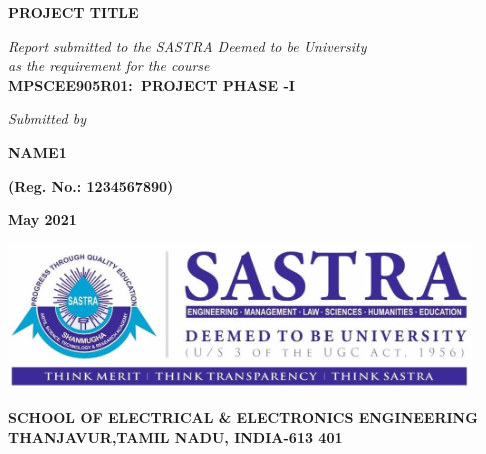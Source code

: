 \documentclass[a4paper, 12pt, oneside]{sastra}
\begin{document}
\onehalfspacing
	
\thispagestyle{empty}
\begin{center}
	\Large{\textbf{PROJECT TITLE}}
\end{center}
\bigskip{}
\bigskip{}
\bigskip{}
\begin{center}
	\textit{Report submitted to the SASTRA Deemed to be University\\ 
		as the requirement for the course\\
	}
	\bigskip{}
	\bigskip{}
	\large{\textbf{MPSCEE905R01:~PROJECT PHASE -I}}
	\bigskip{}
	\bigskip{}
	\bigskip{}
	\bigskip{}
	\bigskip{}
	\bigskip{}
\end{center}
\begin{center}
	\textit{Submitted by}\\
\end{center}
\begin{center}
	\begin{singlespacing}
		\textbf{\Large{NAME1}}
		
		\textbf{\large{(Reg. No.: 1234567890)}}
		
	\end{singlespacing}
\end{center}
\bigskip{}

\begin{center}
	\Large{\textbf{May 2021}}   %
\end{center}
\bigskip{}
\begin{center}
	\includegraphics[height=1.52in, width=4.83in]{sastra_logo}
\end{center}

\begin{center}
	\large{\textbf{SCHOOL OF ELECTRICAL \& ELECTRONICS ENGINEERING}} %
	{\textbf{THANJAVUR,TAMIL NADU, INDIA-613 401}}
\end{center}
\end{document}
